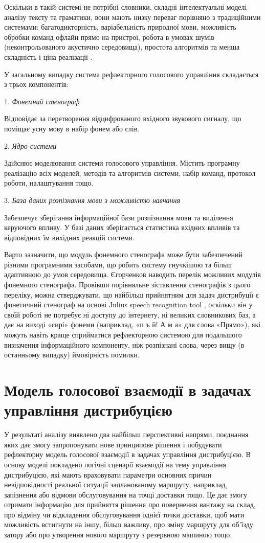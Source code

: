 Оскільки в такій системі не потрібні словники, складні інтелектуальні моделі аналізу тексту та граматики, вони мають низку переваг порівняно з традиційними системами: багатодикторність, варіабельність природної мови, можливість обробки команд офлайн прямо на пристрої, робота в умовах шумів (неконтрольованого акустично середовища), простота алгоритмів та менша складність і ціна реалізації \cite{Teslia_2013}.

У загальному випадку система рефлекторного голосового управління складається з трьох компонентів:

1. \textit{Фонемний стенограф}

Відповідає за перетворення відцифрованого вхідного звукового сигналу, що поміщає усну мову в набір фонем або слів.

2. \textit{Ядро системи}

Здійснює моделювання системи голосового управління. Містить програмну реалізацію всіх моделей, методів та алгоритмів системи, набір команд, протокол роботи, налаштування тощо.

3. \textit{База даних розпізнання мови з можливістю навчання}

Забезпечує зберігання інформаційної бази розпізнання мови та виділення керуючого впливу. У базі даних зберігається статистика вхідних впливів та відповідних їм вихідних реакцій системи.

Варто зазначити, що модуль фонемного стенографа може бути забезпечений різними програмними засобами, що робить систему гнучкішою та більш адаптивною до умов середовища. Єгорченков \cite{Egorchenkov_2016} наводить перелік можливих модулів фонемного стенографа. Провівши порівняльне зіставлення стенографів з цього переліку, можна стверджувати, що найбільш прийнятним для задач дистрибуції є фонетичний стенограф на основі Julius speech recognition tool \cite{Pylypenko_2009}, оскільки він у своїй роботі не потребує ні доступу до інтернету, ні великих словникових баз, а дає на виході «сирі» фонеми (наприклад, «п ъ й! А м а» для слова «Прямо»), які можуть навіть краще сприйматися рефлекторною системою для подальшого визначення інформаційного компоненту, ніж розпізнані слова, через вищу (в останньому випадку) ймовірність помилки.

\section{Модель голосової взаємодії в задачах управління дистрибуцією}
У результаті аналізу виявлено два найбільш перспективні напрями, поєднання яких дає змогу запропонувати нове принципове рішення і побудувати рефлекторну модель голосової взаємодії в задачах управління дистрибуцією. В основу моделі покладено логічні сценарії взаємодії на тему управління дистрибуцією, які мають враховувати параметри основних причин невідповідності реальної ситуації запланованому маршруту, наприклад, запізнення або відмови обслуговування на точці доставки тощо. Це дає змогу отримати інформацію для прийняття рішення про повернення вантажу на склад, про відміну чи відкладення обслуговування однієї точки доставки, щоб мати можливість встигнути на іншу, більш важливу, про зміну маршруту для об’їзду затору або про утворення нового маршруту з резервною машиною тощо.


